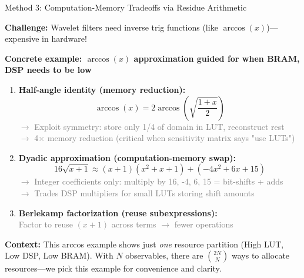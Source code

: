 \documentclass[aspectratio=169,11pt]{beamer}
\begin{document}
\begin{frame}{Method 3: Computation-Memory Tradeoffs via Residue Arithmetic}

\textbf{Challenge:} Wavelet filters need inverse trig functions (like $\arccos(x)$)—expensive in hardware!

\vspace{0.2cm}

\textbf{Concrete example: $\arccos(x)$ approximation guided for when BRAM, DSP needs to be low}

\begin{enumerate}
    \item \textbf{Half-angle identity (memory reduction):}
    \[
    \arccos(x) = 2\arccos\left(\sqrt{\frac{1+x}{2}}\right)
    \]
    \textcolor{gray}{$\rightarrow$ Exploit symmetry: store only 1/4 of domain in LUT, reconstruct rest}\\
    \textcolor{gray}{$\rightarrow$ 4$\times$ memory reduction (critical when sensitivity matrix says "use LUTs")}
    
    \vspace{0.15cm}
    
    \item \textbf{Dyadic approximation (computation-memory swap):}
    \[
    16\sqrt{x+1} \approx (x+1)(x^2+x+1) + (-4x^2 + 6x + 15)
    \]
    \textcolor{gray}{$\rightarrow$ Integer coefficients only: multiply by 16, -4, 6, 15 = bit-shifts + adds}\\
    \textcolor{gray}{$\rightarrow$ Trades DSP multipliers for small LUTs storing shift amounts}
    
    \vspace{0.15cm}
    
    \item \textbf{Berlekamp factorization (reuse subexpressions):}\\
    \textcolor{gray}{Factor to reuse $(x+1)$ across terms $\rightarrow$ fewer operations}
\end{enumerate}

\vspace{0.2cm}

\begin{tcolorbox}[colback=orange!10,colframe=orange!70,title=\textbf{Case Study: ONE of $\binom{2N}{N}$ Possible Configurations}]
\textbf{Context:} This arccos example shows just \emph{one} resource partition (High LUT, Low DSP, Low BRAM). With $N$ observables, there are $\binom{2N}{N}$ ways to allocate resources—we pick this example for convenience and clarity.


\end{tcolorbox}
\end{frame}
\end{document}
